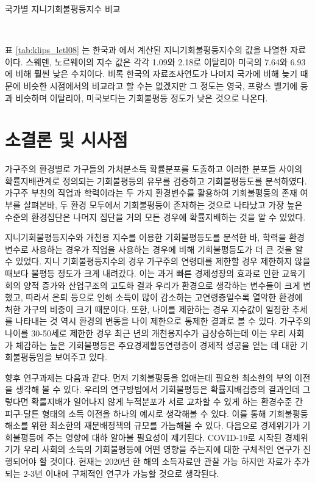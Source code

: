  \begin{table}[htbp]
     \centering
     \caption{국가별 지니기회불평등지수 비교}
     
     \\
     \label{tab:klips_letl08}
 \end{table}

표 \ref{tab:klips_letl08} 는 한국과 \citet{letl08}에서 계산된 지니기회불평등지수의 값을 나열한 자료이다. 스웨덴, 노르웨이의 지수 값은 각각 1.09와 2.18로 이탈리아 미국의 7.64와 6.93에 비해 훨씬 낮은 수치이다. 비록 한국의 자료조사연도가 나머지 국가에 비해 늦기 때문에 비슷한 시점에서의 비교라고 할 수는 없겠지만 그 정도는 영국, 프랑스 벨기에 등과 비슷하며 이탈리아, 미국보다는 기회불평등 정도가 낮은 것으로 나온다.

\section{소결론 및 시사점}
가구주의 환경별로 가구들의 가처분소득 확률분포를 도출하고 이러한 분포들 사이의 확률지배관계로 정의되는 기회불평등의 유무를 검증하고 기회불평등도를 분석하였다.
 가구주 부친의 직업과 학력이라는 두 가지 환경변수를 활용하여 기회불평등의 존재 여부를 살펴본바, 두 환경 모두에서 기회불평등이 존재하는 것으로 나타났고 가장 높은 수준의 환경집단은 나머지 집단을 거의 모든 경우에 확률지배하는 것을 알 수 있었다.
 
지니기회불평등지수와 개천용 지수를 이용한 기회불평등도를 분석한 바, 학력을 환경변수로 사용하는 경우가 직업을 사용하는 경우에 비해 기회불평등도가 더 큰 것을 알 수 있었다.
 지니 기회불평등지수의 경우 가구주의 연령대를 제한할 경우 제한하지 않을 때보다 불평등 정도가 크게 내려갔다.
 이는 과거 빠른 경제성장의 효과로 인한 교육기회의 양적 증가와 산업구조의 고도화 결과 우리가 환경으로 생각하는 변수들이 크게 변했고, 따라서 은퇴 등으로 인해 소득이 많이 감소하는 고연령층일수록 열악한 환경에 처한 가구의 비중이 크기 때문이다.
 또한, 나이를 제한하는 경우 지수값이 일정한 추세를 나타내는 것 역시 환경의 변동을 나이 제한으로 통제한 결과로 볼 수 있다.
 가구주의 나이를 30-50세로 제한한 경우 최근 년의 개천용지수가 급상승하는데 이는 우리 사회가 체감하는 높은 기회불평등은 주요경제활동연령층이 경제적 성공을 얻는 데 대한 기회불평등임을 보여주고 있다.

향후 연구과제는 다음과 같다.
먼저 기회불평등을 없애는데 필요한 최소한의 부의 이전을 생각해 볼 수 있다.
우리의 연구방법에서 기회불평등은 확률지배검증의 결과인데 그렇다면 확룰지배가 일어나지 않게 누적분포가 서로 교차할 수 있게 하는 환경수준 간 피구-달튼 형태의 소득 이전을 하나의 예시로 생각해볼 수 있다.
이를 통해 기회불평등 해소를 위한 최소한의 재분배정책의 규모를 가늠해볼 수 있다.
다음으로 경제위기가 기회불평등에 주는 영향에 대하 알아볼 필요성이 제기된다.
COVID-19로 시작된 경제위기가 우리 사회의 소득의 기회불평등에 어떤 영향을 주는지에 대한 구체적인 연구가 진행되어야 할 것이다. 현재는 2020년 한 해의 소득자료만 관찰 가능 하지만 자료가 추가되는 2-3년 이내에 구체적인 연구가 가능할 것으로 생각된다.